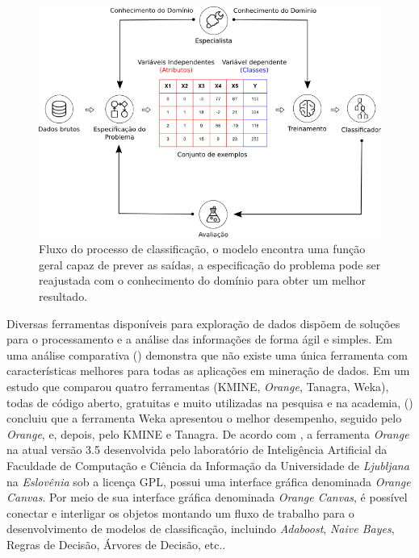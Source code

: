 \begin{figure}[H]
\begin{center}
    \includegraphics[scale=0.60]{images/processo_classificacao.png}
\end{center}
\caption{Fluxo do processo de classificação, o modelo encontra uma função geral 
capaz de prever as saídas, a especificação do problema pode ser reajustada com 
o conhecimento do domínio para obter um melhor resultado.}
\label{figure:processo_classificacao}
\end{figure}

Diversas ferramentas disponíveis para exploração de dados dispõem de soluções 
para o processamento e a análise das informações de forma ágil e simples. 
Em uma análise comparativa  
(\citeyear{boscarioli2014avaliaccao}) demonstra que não 
existe uma única ferramenta com características melhores para todas as 
aplicações em mineração de dados. Em um estudo que comparou quatro ferramentas 
(KMINE, \textit{Orange}, Tanagra, Weka), todas de código aberto, gratuitas e 
muito utilizadas na pesquisa e na academia,  
(\citeyear{wahbeh2011comparison}) concluiu que a ferramenta Weka apresentou o 
melhor desempenho, seguido pelo \textit{Orange}, e, depois, pelo KMINE e 
Tanagra. De acordo com \cite{JMLR:demsar13a}, a ferramenta \textit{Orange} na 
atual versão 3.5 desenvolvida pelo laboratório de Inteligência Artificial da 
Faculdade de Computação e Ciência da Informação da Universidade de 
\textit{Ljubljana} na \textit{Eslovênia} sob a licença GPL, possui uma 
interface gráfica denominada \textit{Orange Canvas}. Por meio de sua interface 
gráfica denominada \textit{Orange Canvas}, é possível conectar e interligar os 
objetos montando um fluxo de trabalho para o desenvolvimento de modelos de 
classificação, incluindo \textit{Adaboost}, \textit{Naive Bayes}, Regras de 
Decisão, Árvores de Decisão, etc..

